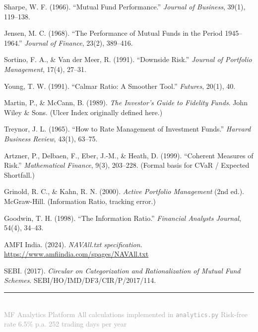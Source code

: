 \documentclass[12pt, a4paper]{article}
\begin{document}
\begin{enumerate}[label={[\arabic*]}]

\item Sharpe, W. F. (1966). ``Mutual Fund Performance.''
  \textit{Journal of Business}, 39(1), 119--138.

\item Jensen, M. C. (1968). ``The Performance of Mutual Funds in the
  Period 1945--1964.''
  \textit{Journal of Finance}, 23(2), 389--416.

\item Sortino, F. A., \& Van der Meer, R. (1991). ``Downside Risk.''
  \textit{Journal of Portfolio Management}, 17(4), 27--31.

\item Young, T. W. (1991). ``Calmar Ratio: A Smoother Tool.''
  \textit{Futures}, 20(1), 40.

\item Martin, P., \& McCann, B. (1989).
  \textit{The Investor's Guide to Fidelity Funds}.
  John Wiley \& Sons. (Ulcer Index originally defined here.)

\item Treynor, J. L. (1965). ``How to Rate Management of Investment
  Funds.'' \textit{Harvard Business Review}, 43(1), 63--75.

\item Artzner, P., Delbaen, F., Eber, J.-M., \& Heath, D. (1999).
  ``Coherent Measures of Risk.''
  \textit{Mathematical Finance}, 9(3), 203--228.
  (Formal basis for CVaR / Expected Shortfall.)

\item Grinold, R. C., \& Kahn, R. N. (2000).
  \textit{Active Portfolio Management} (2nd ed.).
  McGraw-Hill. (Information Ratio, tracking error.)

\item Goodwin, T. H. (1998). ``The Information Ratio.''
  \textit{Financial Analysts Journal}, 54(4), 34--43.

\item AMFI India. (2024). \textit{NAVAll.txt specification}.
  \url{https://www.amfiindia.com/spages/NAVAll.txt}

\item SEBI. (2017). \textit{Circular on Categorization and Rationalization
  of Mutual Fund Schemes}. SEBI/HO/IMD/DF3/CIR/P/2017/114.

\end{enumerate}

\vfill
\begin{center}
\rule{0.5\textwidth}{0.4pt}\\[0.5em]
{\small\textcolor{darkgray}{
  MF Analytics Platform \textbullet{}
  All calculations implemented in \texttt{analytics.py} \textbullet{}
  Risk-free rate 6.5\% p.a. \textbullet{}
  252 trading days per year
}}
\end{center}
\end{document}
